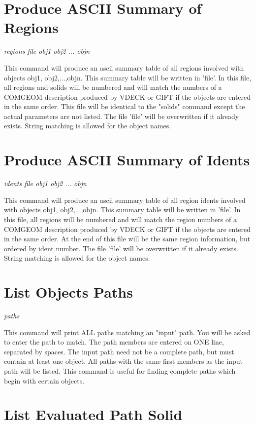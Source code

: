 \section{Produce ASCII Summary of Regions}

{\em \center
regions file obj1 obj2 ... objn
}

This command will produce an ascii summary table of all regions involved with
objects obj1, obj2,...,objn.
This summary table will be written in 'file'.
In this file, all regions and solids will be numbered and will match the numbers
of a COMGEOM description produced by VDECK or GIFT if the objects are entered
in the same order.
This file will be identical to the "solids" command except the actual
parameters are not listed.
The file 'file' will be overwritten if it already exists.
String matching is allowed for the object names.

\section{Produce ASCII Summary of Idents}

{\em \center
idents file obj1 obj2 ... objn
}

This command will produce an ascii summary table of all region idents involved with
objects obj1, obj2,...,objn.
This summary table will be written in 'file'.
In this file, all regions will be numbered and will match the region numbers
of a COMGEOM description produced by VDECK or GIFT if the objects are entered
in the same order.
At the end of this file will be the same region information, but ordered
by ident number.
The file 'file' will be overwritten if it already exists.
String matching is allowed for the object names.

\section{List Objects Paths}

{\em \center
paths
}

This command will print ALL paths matching an "input" path.
You will be asked to enter the path to match.
The path members are entered on ONE line, separated by spaces.
The input path need not be a complete path, but must contain at least one object.
All paths with the same first members as the input path will be listed.
This command is useful for finding complete paths which begin with certain objects.

\section{List Evaluated Path Solid}

